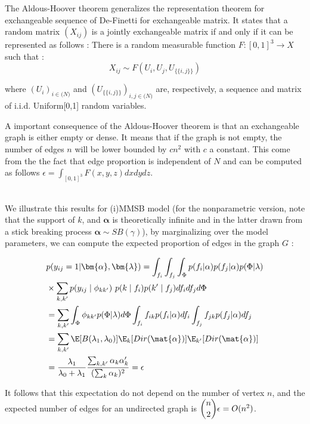 The Aldous-Hoover theorem generalizes the representation theorem for exchangeable sequence of De-Finetti for exchangeable matrix. It states that a random matrix $(X_{ij})$ is a jointly exchangeable matrix if and only if it can be represented as follows : There is a random measurable function $F:[0,1]^3 \rightarrow X$ such that : 
\begin{equation}
X_{ij} \sim F(U_i, U_j, U_{\{\{i,j\}\}})
\end{equation}

where $(U_i)_{i\in \mathbb(N)}$ and $(U_{\{\{i,j\}\}})_{i, j\in \mathbb(N)}$ are, respectively, a sequence and matrix of i.i.d. Uniform[0,1] random variables.

A important consequence of the Aldous-Hoover theorem is that an exchangeable graph is either empty or dense. It means that if the graph is not empty, the number of edges $n$ will be lower bounded by $cn^2$ with $c$ a constant. This  come from the the fact that edge proportion is independent of $N$ and can be computed as follows $\epsilon = \int_{[0,1]^3} F(x, y, z)dxdydz$.

~\\
We illustrate this results for (i)MMSB model (for the nonparametric version, note that the support of $k$, and $\bm\alpha$ is theoretically infinite and in the latter drawn from a stick breaking process  $\bm \alpha \sim SB(\gamma)$), by marginalizing over the model parameters, we can compute the expected proportion of edges in the graph $G$ :

\begin{align*}
&p(y_{ij}=1| \bm{\alpha}, \bm{\lambda}) = \int_{f_i} \int_{f_j} \int_{\Phi} p(f_i| \alpha ) p(f_j| \alpha)p(\Phi| \lambda) \\
&\times \sum_{k,k'} p(y_{ij} \mid \phi_{kk'})\ p(k\mid f_i)p(k'\mid f_j)df_i df_j d\Phi \\
&=  \sum_{k,k'} \int_{\Phi} \phi_{kk'} p(\Phi| \lambda) d\Phi \int_{f_i} f_{ik} p(f_i| \alpha )df_i \int_{f_j} f_{jk}  p(f_j| \alpha ) df_j \\
&= \sum_{k,k'} \E[B(\lambda_1, \lambda_0)] \E_k[Dir(\mat{\alpha} )] \E_{k'}[Dir(\mat{\alpha})] \\
&= \frac{\lambda_1}{\lambda_0+\lambda_1}\frac{\sum_{k,k'} \alpha_k\alpha_k'}{(\sum_k \alpha_k)^2} = \epsilon
\end{align*}

It follows that this expectation do not depend on the number of vertex $n$, and the expected number of edges for an undirected graph is $\dbinom{n}{2} \epsilon = O(n^2)$.

